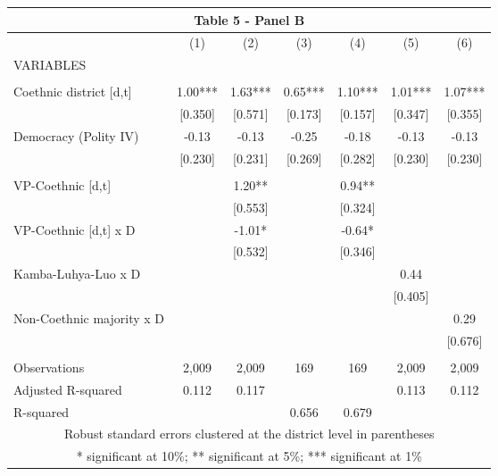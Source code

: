 \begin{tabular}{lcccccc}
\multicolumn{7}{c}{Table 5 - Panel B} \\ \hline
 & (1) & (2) & (3) & (4) & (5) & (6) \\
VARIABLES &  &  &  &  &  &  \\ \hline
 &  &  &  &  &  &  \\
Coethnic district [d,t] & 1.00*** & 1.63*** & 0.65*** & 1.10*** & 1.01*** & 1.07*** \\
 & [0.350] & [0.571] & [0.173] & [0.157] & [0.347] & [0.355] \\
Democracy (Polity IV) & -0.13 & -0.13 & -0.25 & -0.18 & -0.13 & -0.13 \\
 & [0.230] & [0.231] & [0.269] & [0.282] & [0.230] & [0.230] \\
 &  &  &  &  &  &  \\
VP-Coethnic [d,t] &  & 1.20** &  & 0.94** &  &  \\
 &  & [0.553] &  & [0.324] &  &  \\
VP-Coethnic [d,t] x D &  & -1.01* &  & -0.64* &  &  \\
 &  & [0.532] &  & [0.346] &  &  \\
Kamba-Luhya-Luo x D &  &  &  &  & 0.44 &  \\
 &  &  &  &  & [0.405] &  \\
Non-Coethnic majority x D &  &  &  &  &  & 0.29 \\
 &  &  &  &  &  & [0.676] \\
 &  &  &  &  &  &  \\
Observations & 2,009 & 2,009 & 169 & 169 & 2,009 & 2,009 \\
Adjusted R-squared & 0.112 & 0.117 &  &  & 0.113 & 0.112 \\
 R-squared &  &  & 0.656 & 0.679 &  &  \\ \hline
\multicolumn{7}{c}{ Robust standard errors clustered at the district level in parentheses} \\
\multicolumn{7}{c}{ * significant at 10\%; ** significant at 5\%; *** significant at 1\%} \\
\end{tabular}
